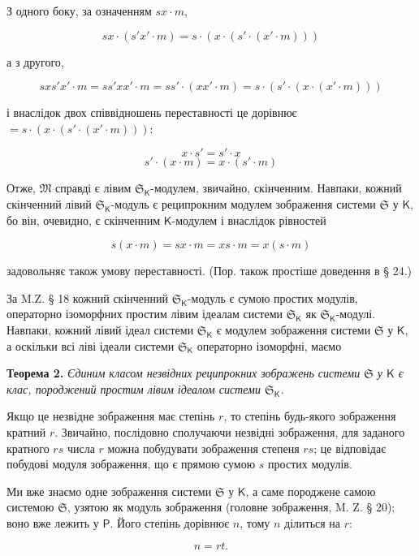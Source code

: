 \documentclass[11pt]{article}
\begin{document}
З одного боку, за означенням \(sx\cdot m\),

\[
sx\cdot(s'x'\cdot m)=s\cdot(x\cdot(s'\cdot(x'\cdot m)))
\]

а з другого,

\[
sx s'x'\cdot m=ss'xx'\cdot m=ss'\cdot(xx'\cdot m)
=s\cdot(s'\cdot(x\cdot(x'\cdot m)))
\]

і внаслідок двох співвідношень переставності це дорівнює \(=s\cdot(x\cdot(s'\cdot(x'\cdot m)))\):

\[
x\cdot s'=s'\cdot x
\]
\[
s'\cdot(x\cdot m)=x\cdot(s'\cdot m)
\]

Отже, \(\mathfrak M\) справді є лівим \(\mathfrak S_{\mathsf K}\)-модулем, звичайно, скінченним. Навпаки, кожний скінченний лівий \(\mathfrak S_{\mathsf K}\)-модуль є реципрокним модулем зображення системи \(\mathfrak S\) у \(\mathsf K\), бо він, очевидно, є скінченним \(\mathsf K\)-модулем і внаслідок рівностей

\[
s(x\cdot m)=sx\cdot m=xs\cdot m=x(s\cdot m)
\]

задовольняє також умову переставності. (Пор. також простіше доведення в § 24.)

За M.Z. § 18 кожний скінченний \(\mathfrak S_{\mathsf K}\)-модуль є сумою простих модулів, операторно ізоморфних простим лівим ідеалам системи \(\mathfrak S_{\mathsf K}\) як \(\mathfrak S_{\mathsf K}\)-модулі. Навпаки, кожний лівий ідеал системи \(\mathfrak S_{\mathsf K}\) є модулем зображення системи \(\mathfrak S\) у \(\mathsf K\), а оскільки всі ліві ідеали системи \(\mathfrak S_{\mathsf K}\) операторно ізоморфні, маємо

\textbf{Теорема 2.} \emph{Єдиним класом незвідних реципрокних зображень системи \(\mathfrak S\) у \(\mathsf K\) є клас, породжений простим лівим ідеалом системи \(\mathfrak S_{\mathsf K}\).}

Якщо це незвідне зображення має степінь \(r\), то степінь будь-якого зображення кратний \(r\). Звичайно, послідовно сполучаючи незвідні зображення, для заданого кратного \(rs\) числа \(r\) можна побудувати зображення степеня \(rs\); це відповідає побудові модуля зображення, що є прямою сумою \(s\) простих модулів.

Ми вже знаємо одне зображення системи \(\mathfrak S\) у \(\mathsf K\), а саме породжене самою системою \(\mathfrak S\), узятою як модуль зображення (головне зображення, M. Z. § 20); воно вже лежить у \(\mathsf P\). Його степінь дорівнює \(n\), тому \(n\) ділиться на \(r\):

\[
n=rt.
\]
\end{document}
